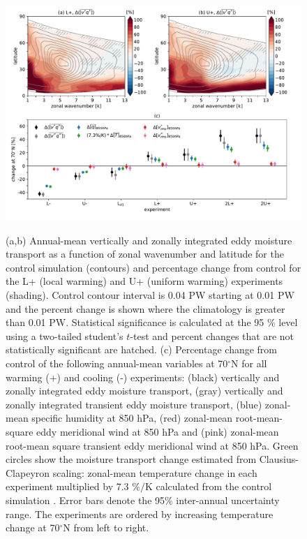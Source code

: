\documentclass[draft]{agujournal2019}
\begin{document}
\newpage
\begin{figure}[ht]
  \noindent\includegraphics[trim=0cm 0cm 0cm 0cm, clip=true,scale=0.5]{./fig_03.pdf}\\
  \caption{(a,b) Annual-mean vertically and zonally integrated eddy moisture transport as a function of zonal wavenumber and latitude for the control simulation (contours) and percentage change from control for the L+ (local warming) and U+ (uniform warming) experiments (shading). Control contour interval is 0.04 PW starting at 0.01 PW and the percent change is shown where the climatology is greater than 0.01 PW. Statistical significance is calculated at the 95 $\%$ level using a two-tailed student's $t$-test and percent changes that are not statistically significant are hatched. (c)  Percentage change from control of the following annual-mean variables at 70$^{\circ}$N for all warming (+) and cooling (-) experiments: (black) vertically and zonally integrated eddy moisture transport, (gray) vertically and zonally integrated transient eddy moisture transport, (blue) zonal-mean specific humidity at 850 hPa, (red) zonal-mean root-mean-square eddy meridional wind at 850 hPa and (pink) zonal-mean root-mean square transient eddy meridional wind at 850 hPa. Green circles show the moisture transport change estimated from Clausius-Clapeyron scaling: zonal-mean temperature change in each experiment multiplied by 7.3 $\%/$K calculated from the control simulation \cite<equations 1 and 2 in>{HeldSoden2006}. Error bars denote the 95$\%$ inter-annual uncertainty range. The experiments are ordered by increasing temperature change at 70$^{\circ}$N from left to right.}\label{f3}
\end{figure}
\end{document}
